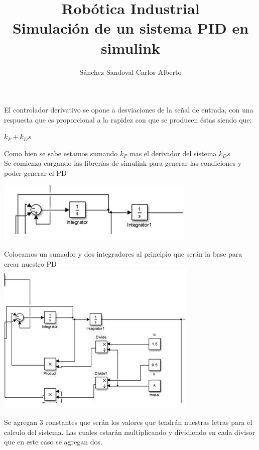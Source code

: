 \documentclass[12pt,letterpaper]{article}
\title{\textbf{Robótica Industrial}\\ Simulación de un sistema PID en simulink }
\author{Sánchez Sandoval Carlos Alberto}
\begin{document}
\maketitle

\begin{flushleft}
El controlador derivativo se opone a desviaciones de la se\~{n}al de entrada, con una respuesta que es proporcional a la rapidez con que se producen \'estas 
 siendo que:\\

\begin{center}
\textbf{$ k_{P}+k_{D}s $}\\ 
\end{center}

\begin{flushleft}
Como bien se sabe estamos sumando $k_{P}$ mas el derivador del sistema $ k_{D}s $\\
Se comienza cargando las librer\'ias de simulink para generar las condiciones y poder generar el PD 
\\
\end{flushleft}
\begin{center}
\includegraphics[scale=1]{simulink2.jpg}\\
\end{center}  
Colocamos un sumador y dos integradores al principio  que serán la base para crear nuestro PD \\
\includegraphics[scale=1]{simulink2-1.jpg}\\ 
\begin{flushleft}
Se agregan 3 constantes que ser\'an los valores que tendr\'an nuestras letras para el calculo del sistema. Las cuales estar\'an multiplicando y dividiendo en  cada divisor que en este caso se agregan dos.  
 

\end{flushleft}
\end{flushleft}
\end{document}
